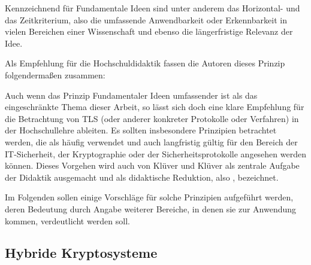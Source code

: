 Kennzeichnend für Fundamentale Ideen sind unter anderem das Horizontal- und das Zeitkriterium, also die umfassende Anwendbarkeit oder Erkennbarkeit in vielen Bereichen einer Wissenschaft und ebenso die längerfristige Relevanz der Idee. 

Als Empfehlung für die Hochschuldidaktik fassen die Autoren dieses Prinzip folgendermaßen zusammen:

\begin{quote}
 \cite{schubert11}
\end{quote}

Auch wenn das Prinzip Fundamentaler Ideen umfassender ist als das eingeschränkte Thema dieser Arbeit, so lässt sich doch eine klare Empfehlung für die Betrachtung von TLS (oder anderer konkreter Protokolle oder Verfahren) in der Hochschullehre ableiten. Es sollten  insbesondere Prinzipien betrachtet werden, die als häufig verwendet und auch langfristig gültig für den Bereich der IT-Sicherheit, der Kryptographie oder der Sicherheitsprotokolle angesehen werden können. 
Dieses Vorgehen wird auch von Klüver und Klüver als zentrale Aufgabe der Didaktik ausgemacht und als didaktische Reduktion, also  \cite{kluever12}, bezeichnet.

Im Folgenden sollen einige Vorschläge für solche Prinzipien aufgeführt werden, deren Bedeutung durch Angabe weiterer Bereiche, in denen sie zur Anwendung kommen, verdeutlicht werden soll. 

\subsection{Hybride Kryptosysteme}

